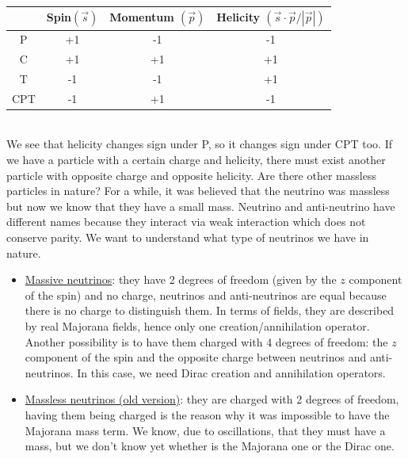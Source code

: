 \documentclass[../main.tex]{subfiles}
\begin{document}
\begin{table}[h]
    \centering
    \begin{tabular}{c|ccc}
     & Spin$(\vec{s})$ & Momentum $(\vec{p})$ & Helicity $(\vec{s}\cdot\vec{p}/|\vec{p}|)$ \\
     \hline
     P & +1 & -1 & -1 \\
     C & +1 & +1 & +1 \\
     T & -1 & -1 & +1 \\
     CPT & -1 & +1 & -1 \\
     \hline
    \end{tabular}
    \caption*{}
    \label{tab:my_label}
\end{table}\\
\noindent
We see that helicity changes sign under P, so it changes sign under CPT too. If we have a particle with a certain charge and helicity, there must exist another particle with opposite charge and opposite helicity. Are there other massless particles in nature? For a while, it was believed that the neutrino was massless but now we know that they have a small mass. Neutrino and anti-neutrino have different names because they interact via weak interaction which does not conserve parity. We want to understand what type of neutrinos we have in nature.
\begin{itemize}
    \item \underline{Massive neutrinos}: they have 2 degrees of freedom (given by the $z$ component of the spin) and no charge, neutrinos and anti-neutrinos are equal because there is no charge to distinguish them. In terms of fields, they are described by real Majorana fields, hence only one creation/annihilation operator. Another possibility is to have them charged with 4 degrees of freedom: the $z$ component of the spin and the opposite charge between neutrinos and anti-neutrinos. In this case, we need Dirac creation and annihilation operators.
    \item \underline{Massless neutrinos (old version)}: they are charged with 2 degrees of freedom, having them being charged is the reason why it was impossible to have the Majorana mass term. We know, due to oscillations, that they must have a mass, but we don't know yet whether is the Majorana one or the Dirac one.
\end{itemize}
\end{document}
